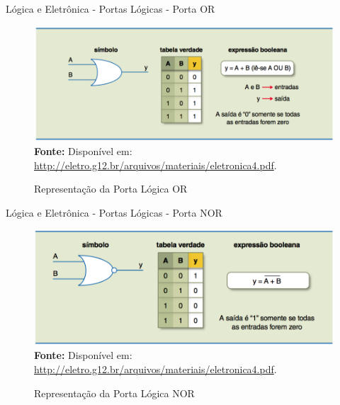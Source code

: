 	\begin{frame}{Lógica e Eletrônica - Portas Lógicas - Porta OR}
		\begin{figure}[h]
			\centering
			\caption{Representação da Porta Lógica OR}
			\includegraphics[height=0.66\textheight]{img/ed/ed-porta_or.png}
			\\
			{\footnotesize \textbf{Fonte:} Disponível em: \url{http://eletro.g12.br/arquivos/materiais/eletronica4.pdf}.}
			\label{fig:ed-porta_OR}
		\end{figure}
	\end{frame}

	\begin{frame}{Lógica e Eletrônica - Portas Lógicas - Porta NOR}
		\begin{figure}[h]
			\centering
			\caption{Representação da Porta Lógica NOR}
			\includegraphics[height=0.66\textheight]{img/ed/ed-porta_nor.png}
			\\
			{\footnotesize \textbf{Fonte:} Disponível em: \url{http://eletro.g12.br/arquivos/materiais/eletronica4.pdf}.}
			\label{fig:ed-porta_NOR}
		\end{figure}
	\end{frame}

